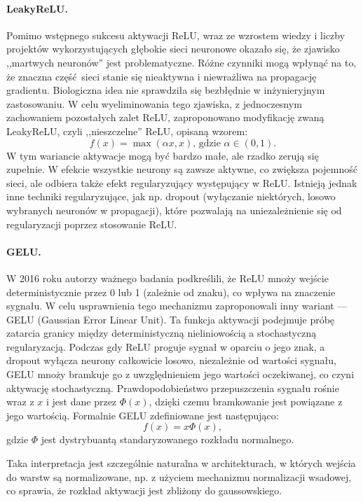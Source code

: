 \paragraph{LeakyReLU.}
Pomimo wstępnego sukcesu aktywacji ReLU, wraz ze wzrostem wiedzy i liczby projektów wykorzystujących głębokie sieci neuronowe okazało się, że zjawisko ,,martwych neuronów'' jest problematyczne. Różne czynniki mogą wpłynąć na to, że znaczna część sieci stanie się nieaktywna i niewrażliwa na propagację gradientu. Biologiczna idea nie sprawdziła się bezbłędnie w inżynieryjnym zastosowaniu. W celu wyeliminowania tego zjawiska, z jednoczesnym zachowaniem pozostałych zalet ReLU, zaproponowano modyfikację zwaną LeakyReLU, czyli ,,nieszczelne'' ReLU, opisaną wzorem:
\[ f(x) = \max(\alpha{x}, x) \text{, gdzie } \alpha \in \left(0, 1\right).\]
W tym wariancie aktywacje mogą być bardzo małe, ale rzadko zerują się zupełnie. W efekcie wszystkie neurony są zawsze aktywne, co zwiększa pojemność sieci, ale odbiera także efekt regularyzujący występujący w ReLU. Istnieją jednak inne techniki regularyzujące, jak np. dropout (wyłączanie niektórych, losowo wybranych neuronów w propagacji), które pozwalają na uniezależnienie się od regularyzacji poprzez stosowanie ReLU.
\paragraph{GELU.}
W 2016 roku autorzy ważnego badania\cite{hendrycks2023gaussianerrorlinearunits} podkreślili, że ReLU mnoży wejście deterministycznie przez 0 lub 1 (zależnie od znaku), co wpływa na znaczenie sygnału. W celu usprawnienia tego mechanizmu zaproponowali inny wariant --- GELU (Gaussian Error Linear Unit). Ta funkcja aktywacji podejmuje próbę zatarcia granicy między deterministyczną nieliniowością a stochastyczną regularyzacją. Podczas gdy ReLU proguje sygnał w oparciu o jego znak, a dropout wyłącza neurony całkowicie losowo, niezależnie od wartości sygnału, GELU mnoży bramkuje go z uwzględnieniem jego wartości oczekiwanej, co czyni aktywację stochastyczną. Prawdopodobieństwo przepuszczenia sygnału rośnie wraz z \(x\) i jest dane przez \(\Phi(x)\), dzięki czemu bramkowanie jest powiązane z jego wartością. Formalnie GELU zdefiniowane jest następująco:
\[f(x)=x\Phi(x),\]
gdzie \(\Phi\) jest dystrybuantą standaryzowanego rozkładu normalnego.

Taka interpretacja jest szczególnie naturalna w architekturach, w których wejścia do warstw są normalizowane, np. z użyciem mechanizmu normalizacji wsadowej, co sprawia, że rozkład aktywacji jest zbliżony do gaussowskiego.

